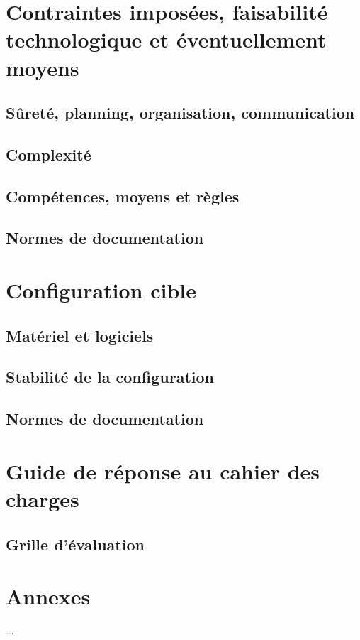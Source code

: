 \section{Contraintes imposées, faisabilité technologique et éventuellement moyens}

    \subsection{Sûreté, planning, organisation, communication}
    
    \subsection{Complexité}
    
    \subsection{Compétences, moyens et règles}
    
    \subsection{Normes de documentation}

\section{Configuration cible}

    \subsection{Matériel et logiciels}
    
    \subsection{Stabilité de la configuration}
    
    \subsection{Normes de documentation}

\section{Guide de réponse au cahier des charges}

    \subsection{Grille d'évaluation}

\section{Annexes}

    ...
